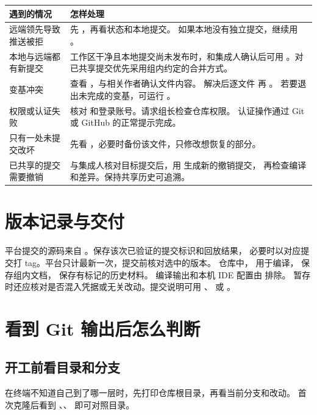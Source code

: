 \documentclass[UTF8,11pt,a4paper]{ctexart}
\begin{document}
\begin{center}\small
\begin{tabularx}{\linewidth}{@{}L{4.3cm}Y@{}}
\toprule
遇到的情况 & 怎样处理 \\
\midrule
远端领先导致推送被拒 &
先 ，再看状态和本地提交。
如果本地没有独立提交，继续用 。 \\
本地与远端都有新提交 &
工作区干净且本地提交尚未发布时，和集成人确认后可用
。对已共享提交优先采用组内约定的合并方式。 \\
变基冲突 &
查看 ，与相关作者确认文件内容。
解决后逐文件  再 。
若要退出未完成的变基，可运行 。 \\
权限或认证失败 &
核对  和登录账号。请求组长检查仓库权限。
认证操作通过 Git 或 GitHub 的正常提示完成。 \\
只有一处未提交改坏 &
先看 ，必要时备份该文件，只修改想恢复的部分。 \\
已共享的提交需要撤销 &
与集成人核对目标提交后，用  生成新的撤销提交，
再检查编译和差异。保持共享历史可追溯。 \\
\bottomrule
\end{tabularx}
\end{center}

\section{版本记录与交付}

平台提交的源码来自 。保存该次已验证的提交标识和回放结果，
必要时以对应提交打 tag。平台只计最新一次，提交前核对选中的版本。
仓库中， 用于编译， 保存组内文档， 保存有标记的历史材料。
编译输出和本机 IDE 配置由  排除。
暂存时还应核对是否混入凭据或无关改动。提交说明可用 、 或 。

\clearpage
\section{看到 Git 输出后怎么判断}

\subsection{开工前看目录和分支}

在终端不知道自己到了哪一层时，先打印仓库根目录，再看当前分支和改动。
首次克隆后看到 、、 即可对照目录。
\end{document}
